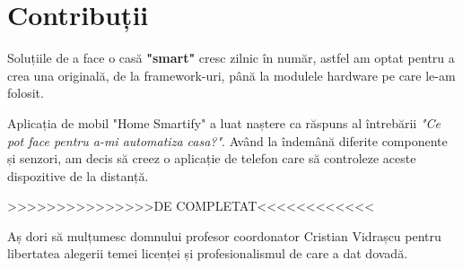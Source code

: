 \chapter*{Contribuții}
Soluțiile de a face o casă \textbf{"smart"} cresc zilnic în număr, astfel am optat pentru a crea una originală, de la framework-uri, până la modulele hardware pe care le-am folosit.

Aplicația de mobil "Home Smartify" a luat naștere ca răspuns al întrebării \emph{"Ce pot face pentru a-mi automatiza casa?"}. Având la îndemână diferite componente și senzori, am decis să creez o aplicație de telefon care să controleze aceste dispozitive de la distanță.

>>>>>>>>>>>>>>>DE COMPLETAT<<<<<<<<<<<< 

Aș dori să mulțumesc domnului profesor coordonator Cristian Vidrașcu pentru libertatea alegerii temei licenței și profesionalismul de care a dat dovadă.
